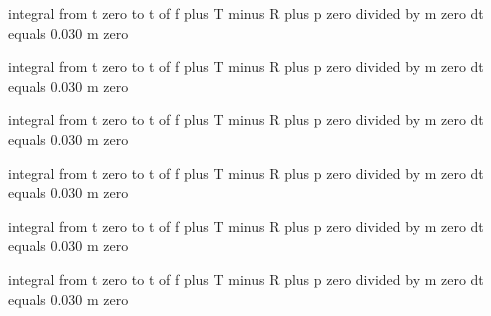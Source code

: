 integral from t zero to t of f plus T minus R plus p zero divided by m zero dt equals 0.030 m zero

integral from t zero to t of f plus T minus R plus p zero divided by m zero dt equals 0.030 m zero

integral from t zero to t of f plus T minus R plus p zero divided by m zero dt equals 0.030 m zero

integral from t zero to t of f plus T minus R plus p zero divided by m zero dt equals 0.030 m zero

integral from t zero to t of f plus T minus R plus p zero divided by m zero dt equals 0.030 m zero

integral from t zero to t of f plus T minus R plus p zero divided by m zero dt equals 0.030 m zero